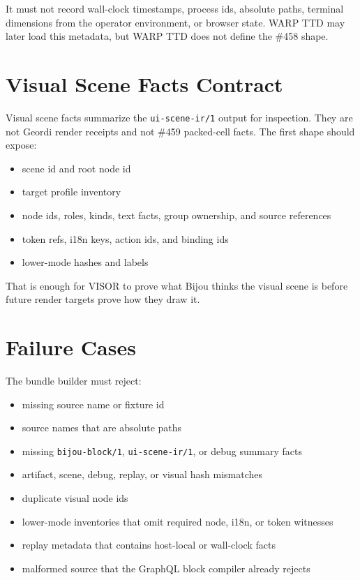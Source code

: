 It must not record wall-clock timestamps, process ids, absolute paths, terminal dimensions from the operator environment, or browser state. WARP TTD may later load this metadata, but WARP TTD does not define the \#458 shape.

\section{Visual Scene Facts Contract}\label{record-145-visual-scene-facts-contract}

Visual scene facts summarize the \texttt{u\allowbreak{}i\allowbreak{}-\allowbreak{}s\allowbreak{}c\allowbreak{}e\allowbreak{}n\allowbreak{}e\allowbreak{}-\allowbreak{}i\allowbreak{}r\allowbreak{}/\allowbreak{}1} output for inspection. They are not Geordi render receipts and not \#459 packed-cell facts. The first shape should expose:

\begin{itemize}
\tightlist
\item
  scene id and root node id
\item
  target profile inventory
\item
  node ids, roles, kinds, text facts, group ownership, and source references
\item
  token refs, i18n keys, action ids, and binding ids
\item
  lower-mode hashes and labels
\end{itemize}

That is enough for VISOR to prove what Bijou thinks the visual scene is before future render targets prove how they draw it.

\section{Failure Cases}\label{record-145-failure-cases}

The bundle builder must reject:

\begin{itemize}
\tightlist
\item
  missing source name or fixture id
\item
  source names that are absolute paths
\item
  missing \texttt{b\allowbreak{}i\allowbreak{}j\allowbreak{}o\allowbreak{}u\allowbreak{}-\allowbreak{}b\allowbreak{}l\allowbreak{}o\allowbreak{}c\allowbreak{}k\allowbreak{}/\allowbreak{}1}, \texttt{u\allowbreak{}i\allowbreak{}-\allowbreak{}s\allowbreak{}c\allowbreak{}e\allowbreak{}n\allowbreak{}e\allowbreak{}-\allowbreak{}i\allowbreak{}r\allowbreak{}/\allowbreak{}1}, or debug summary facts
\item
  artifact, scene, debug, replay, or visual hash mismatches
\item
  duplicate visual node ids
\item
  lower-mode inventories that omit required node, i18n, or token witnesses
\item
  replay metadata that contains host-local or wall-clock facts
\item
  malformed source that the GraphQL block compiler already rejects
\end{itemize}

